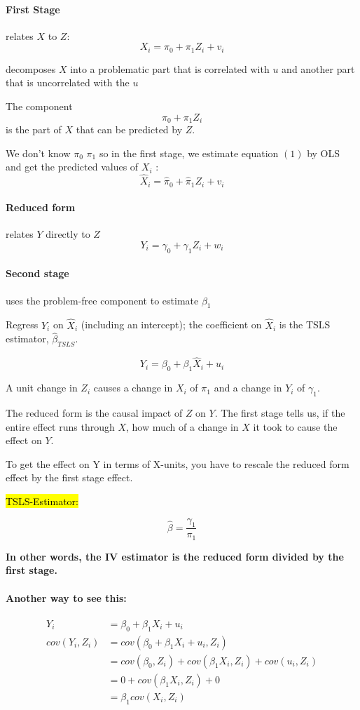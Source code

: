 \documentclass[a3paper, 8pt]{extarticle}
\begin{document}
\begin{multicols*}{5}
\paragraph{First Stage} relates $X$ to $Z$:
\begin{equation}
    X_i=\pi_0+\pi_1Z_i+v_i
\end{equation}

decomposes $X$ into a problematic part that is correlated with $u$ and another part that is uncorrelated with the $u$

The component $$\pi_0+\pi_1Z_i$$
 is the part of $X$ that can be predicted by $Z$.

We don't know $\pi_0$ $\pi_1$ so in the first stage, we estimate equation $(1)$ by OLS and get the predicted values of $X_i$ :
$$\hat{X}_i=\hat{\pi}_0+\hat{\pi}_1Z_i+ v_i$$
\paragraph{Reduced form} relates $Y$ directly to $Z$
$$Y_i=\gamma_0+\gamma_1Z_i+w_i$$



\paragraph{Second stage} uses the problem-free component to estimate $\beta_1$

Regress $Y_i$ on $\hat{X}_i$ (including an intercept); the
coefficient on $\hat{X}_i$ is the TSLS estimator, $\hat{\beta}_{TSLS}$.

$$Y_i= \beta_0 + \beta_1 \hat{X}_i+ u_i $$

A unit change in $Z_i$ causes a change in $X_i$ of $\pi_1$ and a change in $Y_i$ of
$\gamma_1$.

The reduced form is the causal impact of $Z$ on $Y$. The first stage tells us, if the entire effect runs through $X$, how much of a change in $X$ it took to cause the effect on $Y$.


To get the effect on Y in terms of X-units, you have to rescale the reduced form effect by the first stage effect.

\hl{TSLS-Estimator:}

$$\hat{\beta}=\frac{\gamma_1}{\pi_1}$$

\textbf{In other words, the IV estimator is the reduced form divided by
the first stage.}


\paragraph{Another way to see this:}
\begin{align*}
    Y_i &=\beta_0+\beta_1X_i+u_i\\
cov(Y_i,Z_i)&=cov(\beta_0+\beta_1X_i+u_i,Z_i)\\
&=cov(\beta_0, Z_i) + cov(\beta_1X_i, Z_i) +cov(u_i,Z_i)\\
&=0 + cov(\beta_1X_i,Z_i)+0\\
&=\beta_1 cov(X_i, Z_i)
\end{align*}


\end{multicols*}
\end{document}
